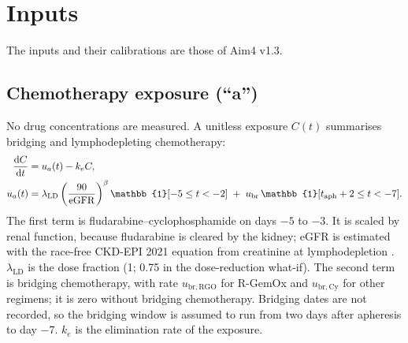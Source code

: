 \documentclass[11pt]{article}
\newcommand{\dd}{\mathrm{d}}
\newcommand{\one}{\mathbb{1}}
\begin{document}
\section{Inputs}
The inputs and their calibrations are those of Aim4 v1.3.

\subsection{Chemotherapy exposure (``a'')}
No drug concentrations are measured. A unitless exposure $C(t)$ summarises bridging and lymphodepleting chemotherapy:
\begin{align}
\frac{\dd C}{\dd t} &= u_a(t) - k_e C, \label{eq:C}\\
u_a(t) &= \lambda_{\mathrm{LD}}\left(\frac{90}{\mathrm{eGFR}}\right)^{\beta}\one[-5\le t<-2]
 \;+\; u_{\mathrm{br}}\,\one[t_{\mathrm{aph}}+\valBrFrom \le t < \valBrTo]. \label{eq:ua}
\end{align}
The first term is fludarabine--cyclophosphamide on days $-5$ to $-3$. It is scaled by renal function, because fludarabine is cleared by the kidney; eGFR is estimated with the race-free CKD-EPI 2021 equation from creatinine at lymphodepletion \citep{inker2021}. $\lambda_{\mathrm{LD}}$ is the dose fraction (1; 0.75 in the dose-reduction what-if). The second term is bridging chemotherapy, with rate $u_{\mathrm{br,RGO}}$ for R-GemOx and $u_{\mathrm{br,Cy}}$ for other regimens; it is zero without bridging chemotherapy. Bridging dates are not recorded, so the bridging window is assumed to run from two days after apheresis to day $-7$. $k_e$ is the elimination rate of the exposure.
\end{document}
